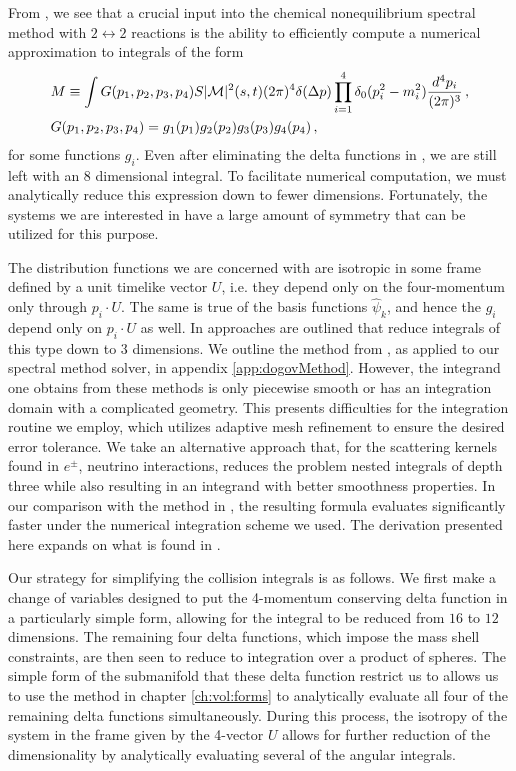 From , we see that a crucial input into the chemical nonequilibrium spectral method with $2 \leftrightarrow 2$ reactions is the ability to efficiently compute a numerical approximation to integrals of the form
\begin{align}\label{coll:Ip}
&M\equiv\int G(p_1,p_2,p_3,p_4) S |\mathcal{M}|^2(s,t) (2\pi)^4\delta(\Delta p)\prod_{i=1}^4 \delta_0(p_i^2-m_i^2)\frac{d^4p_i}{(2\pi)^3}\,,\\
&G(p_1,p_2,p_3,p_4)=g_1(p_1)g_2(p_2)g_3(p_3)g_4(p_4)\,,\notag
\end{align}
for some functions $g_i$. Even after eliminating the delta functions in , we are still left with an $8$ dimensional integral.  To facilitate numerical computation, we must analytically reduce this expression down to fewer dimensions.  Fortunately, the systems we are interested in have a large amount of symmetry that  can be utilized for this purpose.  

The distribution functions we are concerned with are isotropic in some frame defined  by a unit timelike vector $U$, i.e. they depend only on the four-momentum only through $p_i\cdot U$.  The same is true of the basis functions $\hat\psi_k$, and hence the  $g_i$ depend only on $p_i\cdot U$ as well.  In \cite{Hannestad:1995rs,Dolgov:1997mb,Dolgov:1998sf} approaches are outlined that reduce integrals of this type down to $3$ dimensions.  We outline the method from \cite{Dolgov:1997mb,Dolgov:1998sf}, as applied to our spectral method solver, in appendix \ref{app:dogovMethod}.  However, the integrand one obtains from these methods is only piecewise smooth or has an integration domain with a complicated geometry.  This presents difficulties for the integration routine we employ, which utilizes adaptive mesh refinement to ensure the desired error tolerance.  We take an alternative approach that, for the scattering kernels found in $e^\pm$, neutrino interactions, reduces the problem nested integrals  of depth three while also resulting in an integrand with better smoothness properties.  In our comparison with the method in \cite{Dolgov:1997mb,Dolgov:1998sf}, the resulting formula evaluates significantly faster under the numerical integration scheme we used.   The derivation presented here expands on what is found in \cite{Letessier:2002ony}.

\label{coll:simp:sec}
Our strategy for simplifying the collision integrals is as follows.  We first make a change of variables designed to put the 4-momentum conserving delta function in a particularly simple form, allowing for the integral to be reduced from $16$ to $12$ dimensions.  The remaining four delta functions, which impose the mass shell constraints, are then seen to reduce to integration over a product of spheres.  The simple form of the submanifold that these delta function restrict us to allows us to use the method in chapter \ref{ch:vol:forms} to analytically evaluate all four of the remaining delta functions simultaneously.  During this process, the isotropy of the system in the frame given by the 4-vector $U$ allows for further reduction of the dimensionality  by analytically evaluating several of the angular integrals. 

